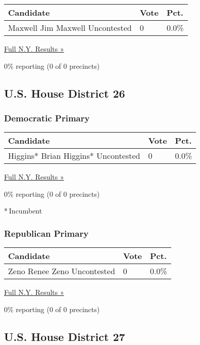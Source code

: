 \begin{longtable}[]{@{}lll@{}}
\toprule
Candidate & Vote & Pct.\tabularnewline
\midrule
\endhead
 Maxwell Jim Maxwell Uncontested & 0 & 0.0\%\tabularnewline
\bottomrule
\end{longtable}

\href{https://www.nytimes3xbfgragh.onion/elections/results/new-york}{Full
N.Y. Results »}

0\% reporting (0 of 0 precincts)

\hypertarget{us-house-district-26}{%
\subsection{U.S. House District 26}\label{us-house-district-26}}

\hypertarget{democratic-primary-26}{%
\subsubsection{Democratic Primary}\label{democratic-primary-26}}

\begin{longtable}[]{@{}lll@{}}
\toprule
Candidate & Vote & Pct.\tabularnewline
\midrule
\endhead
 Higgins* Brian Higgins* Uncontested & 0 & 0.0\%\tabularnewline
\bottomrule
\end{longtable}

\href{https://www.nytimes3xbfgragh.onion/elections/results/new-york}{Full
N.Y. Results »}

0\% reporting (0 of 0 precincts)

* Incumbent

\hypertarget{republican-primary-20}{%
\subsubsection{Republican Primary}\label{republican-primary-20}}

\begin{longtable}[]{@{}lll@{}}
\toprule
Candidate & Vote & Pct.\tabularnewline
\midrule
\endhead
 Zeno Renee Zeno Uncontested & 0 & 0.0\%\tabularnewline
\bottomrule
\end{longtable}

\href{https://www.nytimes3xbfgragh.onion/elections/results/new-york}{Full
N.Y. Results »}

0\% reporting (0 of 0 precincts)

\hypertarget{us-house-district-27}{%
\subsection{U.S. House District 27}\label{us-house-district-27}}

